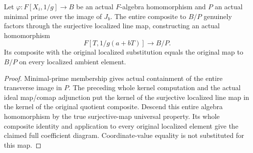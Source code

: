 \begin{definition}
\label{algebra:line-component-whole-map}
\leanok
{}
Let $\varphi:F[X_i,1/g]\to B$ be an actual $F$-algebra homomorphism
and $P$ an actual minimal prime over the image of $J_b$.
The entire composite to $B/P$ genuinely factors through the surjective
localized line map, constructing an actual homomorphism
\[
 F[T,1/g(a+bT)]\longrightarrow B/P.
\]
Its composite with the original localized substitution equals the
original map to $B/P$ on every localized ambient element.
\end{definition}
\begin{proof}
Minimal-prime membership gives actual containment of the entire
transverse image in $P$. The preceding whole kernel computation and
the actual ideal map/comap adjunction put the kernel of the surjective
localized line map in the kernel of the original quotient composite.
Descend this entire algebra homomorphism by the true surjective-map
universal property. Its whole composite identity and application to
every original localized element give the claimed full coefficient
diagram. Coordinate-value equality is not substituted for this map.
\end{proof}

